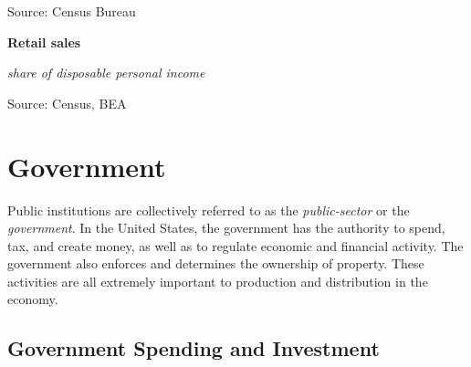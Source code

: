 \documentclass{report}
\newcommand{\tbllink}[1]{\href{https://raw.githubusercontent.com/bdecon/US-chartbook/master/chartbook/data/#1}{\faTable}}
\newcommand{\barylab}[2]{yticklabel style={text width=#1, align=right, 
		style={black!70}, text height=#2},}
\newcommand{\bbar}[2]{extra #1 ticks = {{#2}}, extra #1 tick labels = ,
		extra #1 tick style = {grid=major, grid style={thick, black!25}},}
\newcommand{\barplotnogrid}{xbar=0pt, axis line style={draw=none},
	    yticklabel style={align=left, anchor=east},
      		xmajorticks=false, ymajorgrids=false,   
	    ytick=data, tickwidth=0pt, area legend, reverse legend,
	    nodes near coords, nodes near coords align={horizontal},}
\begin{document}
{{{{\begin{minipage}{0.76\textwidth}
\footnotesize{Source: Census Bureau} \hfill \tbllink{marts.csv}

\end{minipage}
\vspace{9mm}

\begin{minipage}{0.56\textwidth}
\normalsize \textbf{Retail sales}

\footnotesize{\textit{share of disposable personal income}}

\hspace*{-2mm} 

\footnotesize{Source: Census, BEA} \hfill \tbllink{rs_comp.csv}

\end{minipage}
\newpage

\begin{minipage}{0.76\textwidth}
\section*{\color{darkgray}\LARGE Government}
\label{sec:gov}
\normalsize

\small Public institutions are collectively referred to as the \textit{public-sector} or the \textit{government}. In the United States, the government has the authority to spend, tax, and create money, as well as to regulate economic and financial activity. The government also enforces and determines the ownership of property. These activities are all extremely important to production and distribution in the economy.

\subsection*{\color{black!70} \seriffont Government Spending and Investment}
\small   
\vspace{4mm}


\end{minipage}}}}}
\end{document}
